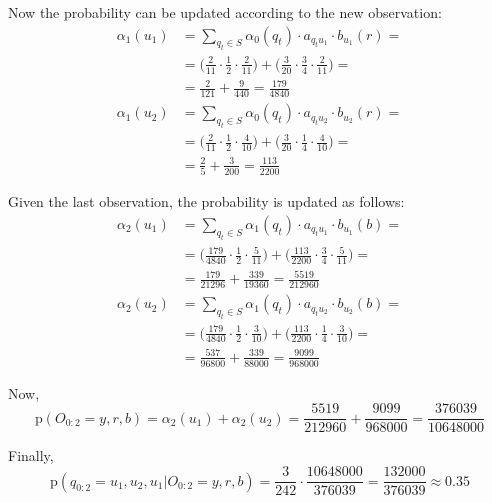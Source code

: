 {\begin{itemize}
		Now the probability can be updated according to the new observation:
		\begin{align*}
		\alpha_1(u_1) & = \sum_{q_t \in S} \alpha_0(q_t) \cdot a_{q_t u_1} 
		\cdot b_{u_1}(r) = \\
		& = \bigg( \frac{2}{11} \cdot \frac{1}{2} \cdot \frac{2}{11} 
		\bigg) + \bigg( \frac{3}{20} \cdot \frac{3}{4} \cdot \frac{2}{11} 
		\bigg) = \\
		& =\frac{2}{121} + \frac{9}{440} = \frac{179}{4840} 
		\\[15pt]
		\alpha_1(u_2) & = \sum_{q_t \in S} \alpha_0(q_t) \cdot a_{q_t u_2} 
		\cdot b_{u_2}(r) = \\
		& =\bigg( \frac{2}{11} \cdot \frac{1}{2} \cdot \frac{4}{10} 
		\bigg) + \bigg( \frac{3}{20} \cdot \frac{1}{4} \cdot \frac{4}{10} 
		\bigg) = \\
		& =\frac{2}{5} + \frac{3}{200} = \frac{113}{2200} 
		\end{align*}
		
		Given the last observation, the probability is updated as follows:
		\begin{align*}
		\alpha_2(u_1) & = \sum_{q_t \in S} \alpha_1(q_t) \cdot a_{q_t u_1} 
		\cdot b_{u_1}(b) = \\
		& = \bigg( \frac{179}{4840} \cdot \frac{1}{2} \cdot \frac{5}{11} 
		\bigg) + \bigg( \frac{113}{2200} \cdot \frac{3}{4} \cdot \frac{5}{11} 
		\bigg) = \\
		& =\frac{179}{21296} + \frac{339}{19360} = \frac{5519}{212960} 
		\\[15pt]
		\alpha_2(u_2) & = \sum_{q_t \in S} \alpha_1(q_t) \cdot a_{q_t u_2} 
		\cdot b_{u_2}(b) = \\
		& =\bigg( \frac{179}{4840} \cdot \frac{1}{2} \cdot \frac{3}{10} 
		\bigg) + \bigg( \frac{113}{2200} \cdot \frac{1}{4} \cdot \frac{3}{10} 
		\bigg) = \\
		& =\frac{537}{96800} + \frac{339}{88000} = \frac{9099}{968000} 
		\end{align*}
		
		Now, 
		\begin{equation*}
		\mathrm{p}(O_{0:2}=y,r,b) = \alpha_2(u_1) + \alpha_2(u_2)  = 
		\frac{5519}{212960} + \frac{9099}{968000} = \frac{376039}{10648000} 
		\end{equation*}
		
		Finally, 
		\begin{equation*}
		\mathrm{p}(q_{0:2}=u_1,u_2, u_1 | O_{0:2}=y,r,b)= \frac{3}{242} 
		\cdot \frac{10648000}{376039} = \frac{132000}{376039} \approx 0.35
		\end{equation*}
			

\end{itemize}}
